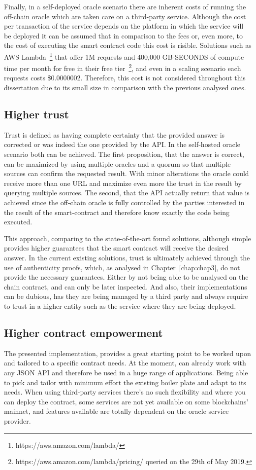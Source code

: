 Finally, in a self-deployed oracle scenario there are inherent costs of running the off-chain oracle which are taken care on a third-party service. Although the cost per transaction of the service depends on the platform in which the service will be deployed it can be assumed that in comparison to the fees or, even more, to the cost of executing the smart contract code this cost is risible. Solutions such as AWS Lambda~\footnote{https://aws.amazon.com/lambda/} that offer 1M requests and 400,000 GB-SECONDS of compute time per month for free in their free tier~\footnote{https://aws.amazon.com/lambda/pricing/ queried on the 29th of May 2019.}, and even in a scaling scenario each requests costs \$0.0000002. Therefore, this cost is not considered throughout this dissertation due to its small size in comparison with the previous analysed ones.

\subsection{Higher trust}

Trust is defined as having complete certainty that the provided answer is corrected or was indeed the one provided by the API. In the self-hosted oracle scenario both can be achieved. The first proposition, that the answer is correct, can be maximized by using multiple oracles and a quorum so that multiple sources can confirm the requested result. With minor alterations the oracle could receive more than one URL and maximize even more the trust in the result by querying multiple sources. The second, that the API actually return that value is achieved since the off-chain oracle is fully controlled by the parties interested in the result of the smart-contract and therefore know exactly the code being executed.

This approach, comparing to the state-of-the-art found solutions, although simple provides higher guarantees that the smart contract will receive the desired answer. In the current existing solutions, trust is ultimately achieved through the use of authenticity proofs, which, as analysed in Chapter~\ref{chap:chap3}, do not provide the necessary guarantees. Either by not being able to be analysed on the chain contract, and can only be later inspected. And also, their implementations can be dubious, has they are being managed by a third party and always require to trust in a higher entity such as the service where they are being deployed.

\subsection{Higher contract empowerment}

The presented implementation, provides a great starting point to be worked upon and tailored to a specific contract needs. At the moment, can already work with any JSON API and therefore be used in a huge range of applications. Being able to pick and tailor with minimum effort the existing boiler plate and adapt to its needs. When using third-party services there's no such flexibility and where you can deploy the contract, some services are not yet available on some blockchains' mainnet, and features available are totally dependent on the oracle service provider.
